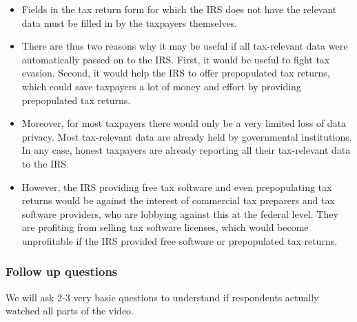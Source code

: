 \documentclass[11pt]{article}
\begin{document}
\begin{itemize}
    \item Fields in the tax return form for which the IRS does not have the relevant data must be filled in by the taxpayers themselves.
    \item There are thus two reasons why it may be useful if all tax-relevant data were automatically passed on to the IRS. First, it would be useful to fight tax evasion. Second, it would help the IRS to offer prepopulated tax returns, which could save taxpayers a lot of money and effort by providing prepopulated tax returns.
    \item Moreover, for most taxpayers there would only be a very limited loss of data privacy. Most tax-relevant data are already held by governmental institutions. In any case, honest taxpayers are already reporting all their tax-relevant data to the IRS. 
    \item However, the IRS providing free tax software and even prepopulating tax returns would be against the interest of commercial tax preparers and tax software providers, who are lobbying against this at the federal level. They are profiting from selling tax software licenses, which would become unprofitable if the IRS provided free software or prepopulated tax returns. 
\end{itemize}
\subsubsection*{Follow up questions}
We will ask 2-3 very basic questions to understand if respondents actually watched all parts of the video.

\newpage
\printbibliography
\end{document}
